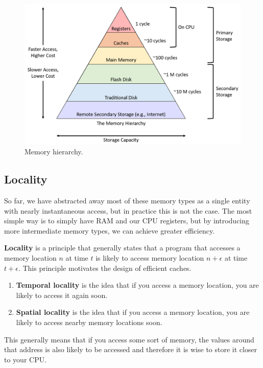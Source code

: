 \documentclass{article}
\begin{document}
    \begin{figure}[H]
      \centering 
      \includegraphics[scale=0.4]{img/memory_hierarchy.png}
      \caption{Memory hierarchy.} 
      \label{fig:memory_hierarchy}
    \end{figure}

  \subsection{Locality}

    So far, we have abstracted away most of these memory types as a single entity with nearly instantaneous access, but in practice this is not the case. The most simple way is to simply have RAM and our CPU registers, but by introducing more intermediate memory types, we can achieve greater efficiency. 

    \begin{definition}[Locality]
      \textbf{Locality} is a principle that generally states that a program that accesses a memory location $n$ at time $t$ is likely to access memory location $n + \epsilon$ at time $t + \epsilon$. This principle motivates the design of efficient caches. 
      \begin{enumerate}
        \item \textbf{Temporal locality} is the idea that if you access a memory location, you are likely to access it again soon. 
        \item \textbf{Spatial locality} is the idea that if you access a memory location, you are likely to access nearby memory locations soon.
      \end{enumerate}
      This generally means that if you access some sort of memory, the values around that address is also likely to be accessed and therefore it is wise to store it closer to your CPU. 
    
    \end{definition}
\end{document}

